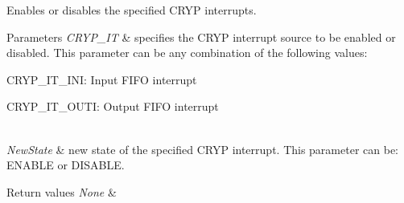 Enables or disables the specified C\+R\+Y\+P interrupts. 


\begin{DoxyParams}{Parameters}
{\em C\+R\+Y\+P\+\_\+\+I\+T} & specifies the C\+R\+Y\+P interrupt source to be enabled or disabled. This parameter can be any combination of the following values\+: \begin{DoxyItemize}
\item C\+R\+Y\+P\+\_\+\+I\+T\+\_\+\+I\+N\+I\+: Input F\+I\+F\+O interrupt \item C\+R\+Y\+P\+\_\+\+I\+T\+\_\+\+O\+U\+T\+I\+: Output F\+I\+F\+O interrupt \end{DoxyItemize}
\\
\hline
{\em New\+State} & new state of the specified C\+R\+Y\+P interrupt. This parameter can be\+: E\+N\+A\+B\+L\+E or D\+I\+S\+A\+B\+L\+E. \\
\hline
\end{DoxyParams}

\begin{DoxyRetVals}{Return values}
{\em None} & \\
\hline
\end{DoxyRetVals}
